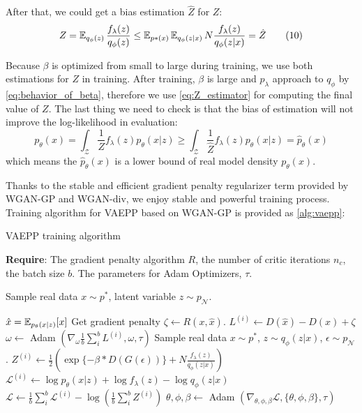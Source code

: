 After that, we could get a bias estimation $\hat{Z}$ for $Z$:
\begin{align*}\label{eq:Z_estimator}
	Z = \operatorname{\mathbb{E}}_{q_\phi(z)}\frac{f_\lambda(z)}{q_\phi(z)} \leq \operatorname{\mathbb{E}}_{p*(x)}\operatorname{\mathbb{E}}_{q_\phi(z|x)} N \frac{f_\lambda(z)}{q_\phi(z|x)} = \hat{Z} \tag{10}
\end{align*}

Because $\beta$ is optimized from small to large during training, we use both estimations for $Z$ in training. After training, $\beta$ is large and $p_\lambda$ approach to $q_\phi$ by \cref{eq:behavior_of_beta}, therefore we use \cref{eq:Z_estimator} for computing the final value of $Z$. The last thing we need to check is that the bias of estimation will not improve the log-likelihood in evaluation:
\begin{equation*}
	p_\theta(x) = \int_{\mathcal{Z}} \frac{1}{Z} f_\lambda(z) p_\theta(x|z) \geq \int_{\mathcal{Z}} \frac{1}{\hat{Z}} f_\lambda(z) p_\theta(x|z) = \hat{p}_\theta(x)
\end{equation*}
which means the $\hat{p}_\theta(x)$ is a lower bound of real model density $p_\theta(x)$.  

Thanks to the stable and efficient gradient penalty regularizer term provided by WGAN-GP and WGAN-div, we enjoy stable and powerful training process. Training algorithm for VAEPP based on WGAN-GP is provided as \cref{alg:vaepp}:
\begin{algorithm}[tb]
\caption{VAEPP training algorithm}
\label{alg:vaepp}
\textbf{Require}: The gradient penalty algorithm $R$, the number of critic iterations $n_c$, the batch size $b$. The parameters for Adam Optimizers, $\tau$. 
\begin{algorithmic}[1] %
\STATE Sample real data $x \sim p^*$, latent variable $z \sim p_\mathcal{N}$.

\STATE	$\hat{x} = \operatorname{\mathbb{E}}_{p_\theta(x|z)}[x]$
\STATE Get gradient penalty $\zeta \gets R(x, \hat{x})$. 
\STATE $L^{(i)} \gets D(\hat{x}) - D(x) + \zeta$
\ENDFOR
\STATE $\omega \gets $ Adam $(\nabla_{\omega} \frac{1}{b}\sum_{i}^b L^{(i)}, \omega, \tau)$
\ENDFOR
{}
\STATE Sample real data $x \sim p^*$, $z \sim q_\phi(z|x)$, $\epsilon \sim p_\mathcal{N}$.
\STATE $Z^{(i)} \gets \frac{1}{2}(\exp\{-\beta * D(G(\epsilon))\} + N \frac{f_\lambda(z)}{q_\phi(z|x)})$
\STATE $\mathcal{L}^{(i)} \gets \log p_\theta(x|z) + \log f_\lambda(z) - \log q_\phi(z|x)$
\ENDFOR
\STATE $\mathcal{L} \gets \frac{1}{b}\sum_{i}^b \mathcal{L}^{(i)} - \log (\frac{1}{b}\sum_{i}^b Z^{(i)})$
\STATE $\theta, \phi, \beta \gets $ Adam $(\nabla_{\theta, \phi, \beta} \mathcal{L}, \{\theta, \phi, \beta\}, \tau)$
\ENDWHILE
\end{algorithmic}
\end{algorithm}

 